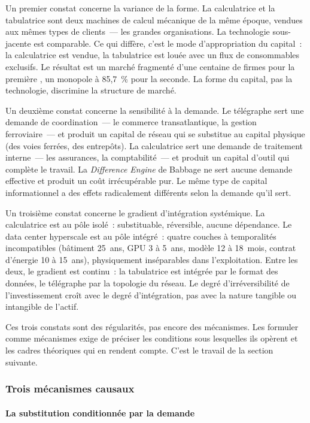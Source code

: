 Un premier constat concerne la variance de la forme. La calculatrice et la tabulatrice sont deux machines de calcul mécanique de la même époque, vendues aux mêmes types de clients~--- les grandes organisations. La technologie sous-jacente est comparable. Ce qui diffère, c'est le mode d'appropriation du capital~: la calculatrice est vendue, la tabulatrice est louée avec un flux de consommables exclusifs. Le résultat est un marché fragmenté d'une centaine de firmes pour la première \parencite{cortada_before_1993}, un monopole à 85,7~\% pour la seconde. La forme du capital, pas la technologie, discrimine la structure de marché.

Un deuxième constat concerne la sensibilité à la demande. Le télégraphe sert une demande de coordination~--- le commerce transatlantique, la gestion ferroviaire~--- et produit un capital de réseau qui se substitue au capital physique (des voies ferrées, des entrepôts). La calculatrice sert une demande de traitement interne~--- les assurances, la comptabilité~--- et produit un capital d'outil qui complète le travail. La \emph{Difference Engine} de Babbage ne sert aucune demande effective et produit un coût irrécupérable pur. Le même type de capital informationnel a des effets radicalement différents selon la demande qu'il sert.

Un troisième constat concerne le gradient d'intégration systémique. La calculatrice est au pôle isolé~: substituable, réversible, aucune dépendance. Le data center hyperscale est au pôle intégré~: quatre couches à temporalités incompatibles (bâtiment 25~ans, GPU 3 à 5~ans, modèle 12 à 18~mois, contrat d'énergie 10 à 15~ans), physiquement inséparables dans l'exploitation. Entre les deux, le gradient est continu~: la tabulatrice est intégrée par le format des données, le télégraphe par la topologie du réseau. Le degré d'irréversibilité de l'investissement croît avec le degré d'intégration, pas avec la nature tangible ou intangible de l'actif.

Ces trois constats sont des régularités, pas encore des mécanismes. Les formuler comme mécanismes exige de préciser les conditions sous lesquelles ils opèrent et les cadres théoriques qui en rendent compte. C'est le travail de la section suivante.


\subsubsection{Trois mécanismes causaux}

\paragraph{La substitution conditionnée par la demande}

